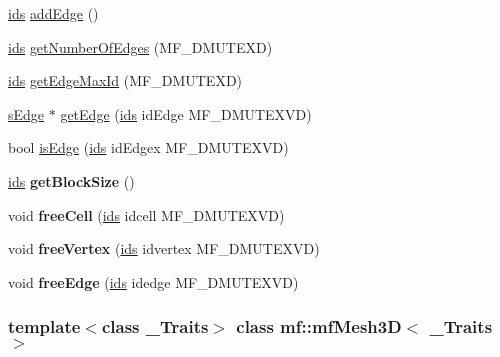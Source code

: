 \begin{DoxyCompactItemize}
\item 
\hyperlink{classmf_1_1mfMesh3D_aeae559d0564bf64617c8fd83ba264895}{ids} \hyperlink{classmf_1_1mfMesh3D_a10ce55cc76de42b5aa0f7c4244763f44}{addEdge} ()
\item 
\hyperlink{classmf_1_1mfMesh3D_aeae559d0564bf64617c8fd83ba264895}{ids} \hyperlink{classmf_1_1mfMesh3D_adaf8348280fa19542ea5de9ba47f1d12}{getNumberOfEdges} (MF\_\-DMUTEXD)
\item 
\hyperlink{classmf_1_1mfMesh3D_aeae559d0564bf64617c8fd83ba264895}{ids} \hyperlink{classmf_1_1mfMesh3D_a2dd4c8a343fa1173b6a7c78b4aa050b0}{getEdgeMaxId} (MF\_\-DMUTEXD)
\item 
\hyperlink{classmf_1_1mfMesh3D_a93992ed7712bd9dbcc0430166a540d1c}{sEdge} $\ast$ \hyperlink{classmf_1_1mfMesh3D_a7a033f10bb1bc509d62a53f34086e220}{getEdge} (\hyperlink{classmf_1_1mfMesh3D_aeae559d0564bf64617c8fd83ba264895}{ids} idEdge MF\_\-DMUTEXVD)
\item 
bool \hyperlink{classmf_1_1mfMesh3D_a63b15118d28b6f6ceb4b19670148788a}{isEdge} (\hyperlink{classmf_1_1mfMesh3D_aeae559d0564bf64617c8fd83ba264895}{ids} idEdgex MF\_\-DMUTEXVD)
\item 
\hypertarget{classmf_1_1mfMesh3D_a4bba26cee832afb1474ae9e8f6549525}{
\hyperlink{classmf_1_1mfMesh3D_aeae559d0564bf64617c8fd83ba264895}{ids} {\bfseries getBlockSize} ()}
\label{classmf_1_1mfMesh3D_a4bba26cee832afb1474ae9e8f6549525}

\item 
\hypertarget{classmf_1_1mfMesh3D_a5c1dd2261484b87e16fddbe0e276a977}{
void {\bfseries freeCell} (\hyperlink{classmf_1_1mfMesh3D_aeae559d0564bf64617c8fd83ba264895}{ids} idcell MF\_\-DMUTEXVD)}
\label{classmf_1_1mfMesh3D_a5c1dd2261484b87e16fddbe0e276a977}

\item 
\hypertarget{classmf_1_1mfMesh3D_a859fade6e91a75968a66e72aa33f6a4a}{
void {\bfseries freeVertex} (\hyperlink{classmf_1_1mfMesh3D_aeae559d0564bf64617c8fd83ba264895}{ids} idvertex MF\_\-DMUTEXVD)}
\label{classmf_1_1mfMesh3D_a859fade6e91a75968a66e72aa33f6a4a}

\item 
\hypertarget{classmf_1_1mfMesh3D_a437b244a6f61a1f0d225cff9c739b064}{
void {\bfseries freeEdge} (\hyperlink{classmf_1_1mfMesh3D_aeae559d0564bf64617c8fd83ba264895}{ids} idedge MF\_\-DMUTEXVD)}
\label{classmf_1_1mfMesh3D_a437b244a6f61a1f0d225cff9c739b064}

\end{DoxyCompactItemize}
\subsubsection*{template$<$class \_\-Traits$>$ class mf::mfMesh3D$<$ \_\-Traits $>$}



